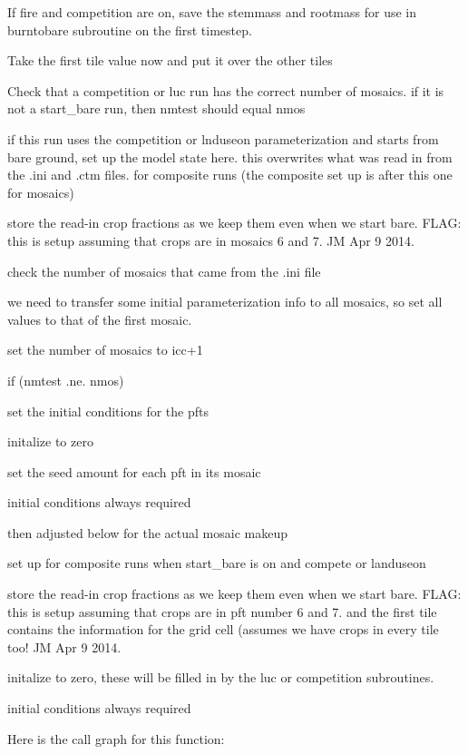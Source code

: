 If fire and competition are on, save the stemmass and rootmass for use in burntobare subroutine on the first timestep.

Take the first tile value now and put it over the other tiles

Check that a competition or luc run has the correct number of mosaics. if it is not a start\+\_\+bare run, then nmtest should equal nmos

if this run uses the competition or lnduseon parameterization and starts from bare ground, set up the model state here. this overwrites what was read in from the .ini and .ctm files. for composite runs (the composite set up is after this one for mosaics)

store the read-\/in crop fractions as we keep them even when we start bare. F\+L\+A\+G\+: this is setup assuming that crops are in mosaics 6 and 7. J\+M Apr 9 2014.

check the number of mosaics that came from the .ini file

we need to transfer some initial parameterization info to all mosaics, so set all values to that of the first mosaic.

set the number of mosaics to icc+1

if (nmtest .ne. nmos)

set the initial conditions for the pfts

initalize to zero

set the seed amount for each pft in its mosaic

initial conditions always required

then adjusted below for the actual mosaic makeup

set up for composite runs when start\+\_\+bare is on and compete or landuseon

store the read-\/in crop fractions as we keep them even when we start bare. F\+L\+A\+G\+: this is setup assuming that crops are in pft number 6 and 7. and the first tile contains the information for the grid cell (assumes we have crops in every tile too! J\+M Apr 9 2014.

initalize to zero, these will be filled in by the luc or competition subroutines.

initial conditions always required 

Here is the call graph for this function\+:


